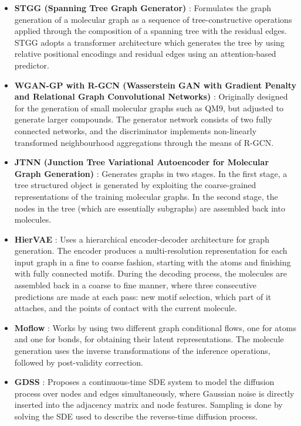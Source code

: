 \begin{itemize}
    \item \textbf{STGG (Spanning Tree Graph Generator)} \cite{ahn2021spanning}: Formulates the graph generation of a molecular graph as a sequence of tree-constructive operations applied through the composition of a spanning tree with the residual edges. STGG adopts a transformer architecture which generates the tree by using relative positional encodings and residual edges using an attention-based predictor.
    
    \item \textbf{WGAN-GP with R-GCN (Wasserstein GAN with Gradient Penalty and Relational Graph Convolutional Networks)} \cite{keras2021wgan}: Originally designed for the generation of small molecular graphs such as QM9, but adjusted to generate larger compounds. The generator network consists of two fully connected networks, and the discriminator implements non-linearly transformed neighbourhood aggregations through the means of R-GCN.

    \item \textbf{JTNN (Junction Tree Variational Autoencoder for Molecular Graph Generation)} \cite{jin2018junction}: Generates graphs in two stages. In the first stage, a tree structured object is generated by exploiting the coarse-grained representations of the training molecular graphs. In the second stage, the nodes in the tree (which are essentially subgraphs) are assembled back into molecules.

    \item \textbf{HierVAE} \cite{jin2020hiervae}: Uses a hierarchical encoder-decoder architecture for graph generation. The encoder produces a multi-resolution representation for each input graph in a fine to coarse fashion, starting with the atoms and finishing with fully connected motifs. During the decoding process, the molecules are assembled back in a coarse to fine manner, where three consecutive predictions are made at each pass: new motif selection, which part of it attaches, and the points of contact with the current molecule.

    \item \textbf{Moflow} \cite{zang2020moflow}: Works by using two different graph conditional flows, one for atoms and one for bonds, for obtaining their latent representations. The molecule generation uses the inverse transformations of the inference operations, followed by post-validity correction.

    \item \textbf{GDSS} \cite{jo2022score}: Proposes a continuous-time SDE system to model the diffusion process over nodes and edges simultaneously, where Gaussian noise is directly inserted into the adjacency matrix and node features. Sampling is done by solving the SDE used to describe the reverse-time diffusion process.


\end{itemize}
